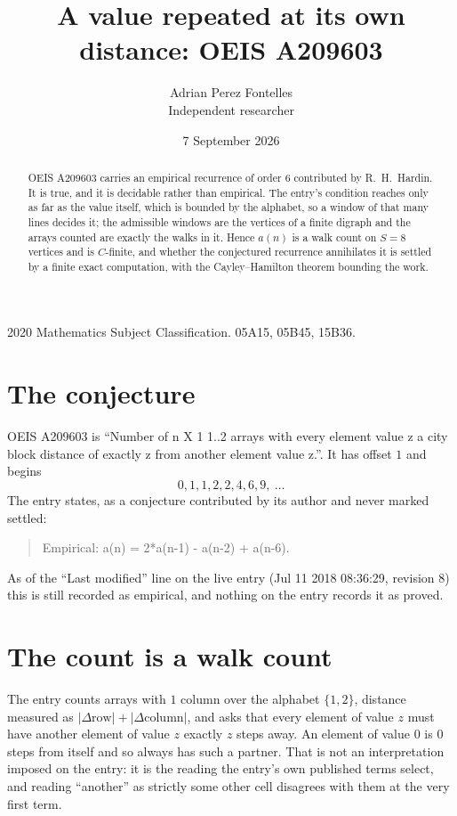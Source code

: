 \documentclass[11pt,a4paper]{article}
\title{A value repeated at its own distance: OEIS A209603}
\author{Adrian Perez Fontelles\\ \small Independent researcher}
\date{7 September 2026}
\theoremstyle{plain}
\theoremstyle{definition}
\begin{document}
\maketitle

\begin{abstract}
OEIS A209603 carries an empirical recurrence of order $6$ contributed by R.~H.~Hardin. It is
true, and it is decidable rather than empirical. The entry's condition reaches only as far as the value itself, which is bounded by the
alphabet, so a window of that many lines decides it; the
admissible windows are the vertices of a finite digraph and the arrays counted are exactly the
walks in it. Hence $a(n)$ is a walk count on $S=8$ vertices and is $C$-finite, and whether the
conjectured recurrence annihilates it is settled by a finite exact computation, with the
Cayley--Hamilton theorem bounding the work.
\end{abstract}

\noindent\small 2020 Mathematics Subject Classification. 05A15, 05B45, 15B36.\normalsize

\section{The conjecture}

OEIS A209603 is ``Number of n X 1 1..2 arrays with every element value z a city block distance of exactly z from another element value z.''. It has offset $1$ and begins
\[
0, 1, 1, 2, 2, 4, 6, 9,\ \dots
\]
The entry states, as a conjecture contributed by its author and never marked settled:
\begin{quote}
Empirical: a(n) = 2*a(n-1) - a(n-2) + a(n-6).
\end{quote}
As of the ``Last modified'' line on the live entry (Jul 11 2018 08:36:29, revision 8) this is still
recorded as empirical, and nothing on the entry records it as proved.

\section{The count is a walk count}

The entry counts arrays with $1$ column over the alphabet $\{1,2\}$, distance measured as $|\Delta \text{row}|+|\Delta \text{column}|$, and asks that every element of value $z$ must have another element of value $z$ exactly $z$ steps away. An element of value $0$ is $0$ steps from itself and so always has such a partner. That is not an interpretation imposed on the entry: it is the reading the entry's own published terms select, and reading ``another'' as strictly some other cell disagrees with them at the very first term.
\end{document}
